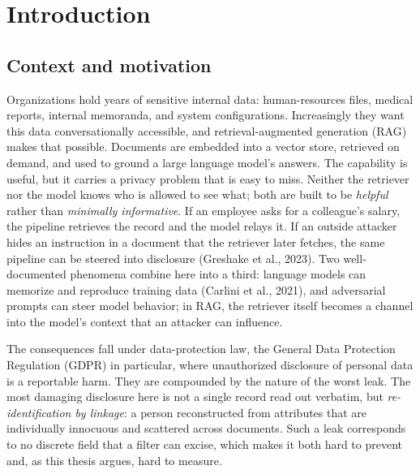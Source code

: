 \documentclass[12pt,a4paper]{report}
\begin{document}
\tableofcontents
\listoffigures
\listoftables

\cleardoublepage
{}   %
\hypersetup{pageanchor=true}   %
\chapter{Introduction}
\label{ch:intro}

\section{Context and motivation}
\label{sec:intro-context}

Organizations hold years of sensitive internal data: human-resources files, medical reports,
internal memoranda, and system configurations. Increasingly they want this data conversationally
accessible, and retrieval-augmented generation (RAG) makes that possible. Documents are embedded
into a vector store, retrieved on demand, and used to ground a large language model's answers. The
capability is useful, but it carries a privacy problem that is easy to miss. Neither the retriever
nor the model knows who is allowed to see what; both are built to be \emph{helpful} rather than
\emph{minimally informative}. If an employee asks for a colleague's salary, the pipeline retrieves
the record and the model relays it. If an outside attacker hides an instruction in a document that
the retriever later fetches, the same pipeline can be steered into disclosure (Greshake et al., 2023).
Two well-documented phenomena combine here into a third: language models can memorize and reproduce
training data (Carlini et al., 2021), and adversarial prompts can steer model behavior; in
RAG, the retriever itself becomes a channel into the model's context that an attacker can influence.

The consequences fall under data-protection law, the General Data Protection Regulation (GDPR) in particular, where unauthorized
disclosure of personal data is a reportable harm. They are compounded by the nature of the worst
leak. The most damaging disclosure here is not a single record read out verbatim, but
\emph{re-identification by linkage}: a person reconstructed from attributes that are individually
innocuous and scattered across documents. Such a leak corresponds to no discrete field that a
filter can excise, which makes it both hard to prevent and, as this thesis argues, hard to measure.
\end{document}
